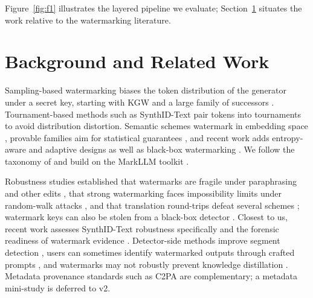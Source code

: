 \documentclass[10pt,letterpaper]{article}
\begin{document}
Figure~\ref{fig:f1} illustrates the layered pipeline we evaluate;
Section~\ref{sec:background} situates the work relative to the
watermarking literature.

\section{Background and Related Work}
\label{sec:background}
Sampling-based watermarking biases the token distribution of the
generator under a secret key, starting with KGW
\citep{kirchenbauer2023kwg} and a large family of successors
\citep{christ2023undetectable,kuditipudi2023robust,hu2023unbiased,
wu2023dipmark,zhao2024permute,huo2024tswatermark,liu2024adaptive}.
Tournament-based methods such as SynthID-Text
\citep{deepmind2024synthidtext,omidi2026synthid} pair tokens into
tournaments to avoid distribution distortion. Semantic schemes
watermark in embedding space \citep{liu2023sir,hou2023semstamp,
hou2024ksemstamp}, provable families aim for statistical guarantees
\citep{liu2023upv}, and recent work adds entropy-aware and adaptive
designs \citep{gu2025invisible,wang2025morphmark} as well as
black-box watermarking \citep{yang2023blackbox}. We follow the
taxonomy of \citet{liu2023survey} and build on the MarkLLM toolkit
\citep{pan2024markllm}.

Robustness studies established that watermarks are fragile under
paraphrasing and other edits \citep{kirchenbauer2023reliability}, that
strong watermarking faces impossibility limits under random-walk
attacks \citep{zhang2023sand,harelcanada2025sandcastles}, and that
translation round-trips defeat several schemes \citep{he2024xsir};
watermark keys can also be stolen from a black-box detector
\citep{jovanovic2024stealing}. Closest to us, recent work assesses
SynthID-Text robustness specifically \citep{han2025synthid,
omidi2026synthid} and the forensic readiness of watermark evidence
\citep{tamim2026forensic}. Detector-side methods improve segment
detection \citep{pan2024waterseeker,lu2024ewd}, users can sometimes
identify watermarked outputs through crafted prompts
\citep{liu2024crafted}, and watermarks may not robustly prevent
knowledge distillation \citep{pan2025distillation}. Metadata
provenance standards such as C2PA \citep{c2pa2024spec} are
complementary; a metadata mini-study is deferred to v2.
\end{document}
